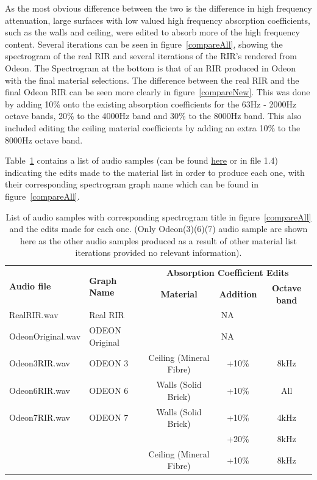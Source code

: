 \documentclass[../../main.tex]{subfiles}
\begin{document}
			 As the most obvious difference between the two is the difference in high frequency attenuation, large surfaces with low valued high frequency absorption coefficients, such as the walls and ceiling, were edited to absorb more of the high frequency content. Several iterations can be seen in figure~\ref{compareAll}, showing the spectrogram of the real \ac{RIR} and several iterations of the \ac{RIR}'s rendered from Odeon. The Spectrogram at the bottom is that of an \ac{RIR} produced in Odeon with the final material selections. The difference between the real RIR and the final Odeon \ac{RIR} can be seen more clearly in figure~\ref{compareNew}. This was done by adding 10\% onto the existing absorption coefficients for the 63Hz - 2000Hz octave bands, 20\% to the 4000Hz band and 30\% to the 8000Hz band. This also included editing the ceiling material coefficients by adding an extra 10\% to the 8000Hz octave band.

			Table~\ref{materialTable} contains a list of audio samples (can be found \href{http://lt669.github.io/pages/audioSamples.html}{here} or in file 1.4) indicating the edits made to the material list in order to produce each one, with their corresponding spectrogram graph name which can be found in figure~\ref{compareAll}.

			\begin{table}[h]
				\centering
				\begin{tabular}{|l | l | c | c | c |} 
					\hline
					\multirow{2}{*}{\textbf{Audio file}} & \multirow{2}{*}{\textbf{Graph Name}} & \multicolumn{3}{c|}{\textbf{Absorption Coefficient Edits}} \\ \cline{3-5}
					 & & \textbf{Material} & \textbf{Addition} & \textbf{Octave band} \\ \hline
					RealRIR.wav & Real RIR & \multicolumn{3}{c|}{NA}\\ \hline
					OdeonOriginal.wav & ODEON Original & \multicolumn{3}{c|}{NA}\\ \hline
					Odeon3RIR.wav & ODEON 3 & Ceiling (Mineral Fibre) & +10\% & 8kHz\\ \hline
					Odeon6RIR.wav & ODEON 6 & Walls (Solid Brick) & +10\% & All\\ \hline
					Odeon7RIR.wav & ODEON 7 & Walls (Solid Brick) & +10\% & 4kHz\\ 
					& & & +20\% & 8kHz \\
					& & Ceiling (Mineral Fibre) & +10\% & 8kHz\\ \hline
				\end{tabular}
				\caption{List of audio samples with corresponding spectrogram title in figure~\ref{compareAll} and the edits made for each one. (Only Odeon(3)(6)(7) audio sample are shown here as the other audio samples produced as a result of other material list iterations provided no relevant information).}
				\label{materialTable}
			\end{table}
\end{document}

